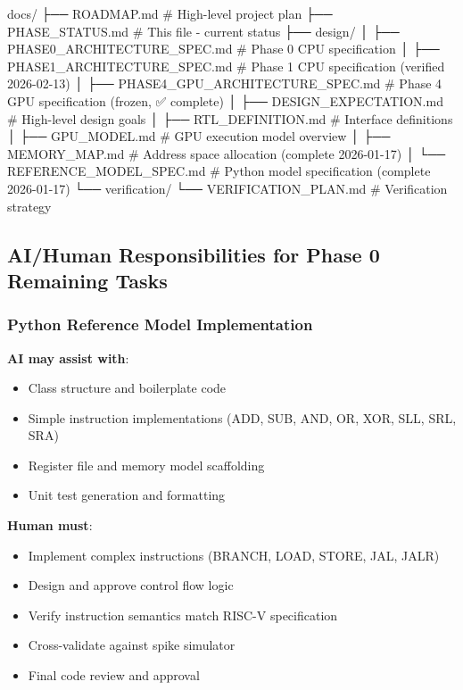 \begin{record}

\begin{textblock}
docs/
├── ROADMAP.md                        # High-level project plan
├── PHASE_STATUS.md                   # This file - current status
├── design/
│   ├── PHASE0_ARCHITECTURE_SPEC.md   # Phase 0 CPU specification
│   ├── PHASE1_ARCHITECTURE_SPEC.md   # Phase 1 CPU specification (verified 2026-02-13)
│   ├── PHASE4_GPU_ARCHITECTURE_SPEC.md # Phase 4 GPU specification (frozen, ✅ complete)
│   ├── DESIGN_EXPECTATION.md         # High-level design goals
│   ├── RTL_DEFINITION.md             # Interface definitions
│   ├── GPU_MODEL.md                  # GPU execution model overview
│   ├── MEMORY_MAP.md                 # Address space allocation (complete 2026-01-17)
│   └── REFERENCE_MODEL_SPEC.md       # Python model specification (complete 2026-01-17)
└── verification/
    └── VERIFICATION_PLAN.md          # Verification strategy
\end{textblock}

\end{record}

\subsection{AI/Human Responsibilities for Phase 0 Remaining Tasks}\label{cr:status:phase-status:aihuman-responsibilities-for-phase-0-remaining-tasks}

\subsubsection{Python Reference Model Implementation}\label{cr:status:phase-status:python-reference-model-implementation}

\begin{record}

\textbf{AI may assist with}:

\begin{itemize}
\tightlist
\item
  Class structure and boilerplate code
\item
  Simple instruction implementations (ADD, SUB, AND, OR, XOR, SLL, SRL,
  SRA)
\item
  Register file and memory model scaffolding
\item
  Unit test generation and formatting
\end{itemize}

\textbf{Human must}:

\begin{itemize}
\tightlist
\item
  Implement complex instructions (BRANCH, LOAD, STORE, JAL, JALR)
\item
  Design and approve control flow logic
\item
  Verify instruction semantics match RISC-V specification
\item
  Cross-validate against spike simulator
\item
  Final code review and approval
\end{itemize}

\end{record}

